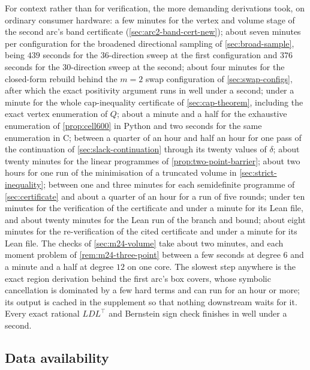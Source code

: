 \documentclass[11pt,reqno]{amsart}
\renewcommand{\_}{\origunderscore\allowbreak}
\numberwithin{equation}{section}
\theoremstyle{plain}
\theoremstyle{definition}
\theoremstyle{remark}
\begin{document}
For context rather than for verification, the more demanding derivations
took, on ordinary consumer hardware: a few minutes for the vertex and
volume stage of the second arc's band certificate
(\cref{sec:arc2-band-cert-new}); about seven minutes per configuration
for the broadened directional sampling of \cref{sec:broad-sample},
being $439$ seconds for the $36$-direction sweep at the first
configuration and $376$ seconds for the $30$-direction sweep at the
second; about four minutes for the closed-form rebuild behind the $m=2$
swap configuration of \cref{sec:swap-configs}, after which the exact
positivity argument runs in well under a second; under a minute for
the whole cap-inequality certificate of \cref{sec:cap-theorem},
including the exact vertex enumeration of $Q$; about a minute and a half
for the exhaustive enumeration of \cref{prop:cell600} in Python and two
seconds for the same enumeration in C; between a quarter of an hour
and half an hour for one pass of the continuation of
\cref{sec:slack-continuation} through its twenty values of $\delta$;
about twenty minutes for the linear programmes of
\cref{prop:two-point-barrier}; about two hours for one run of the
minimisation of a truncated volume in \cref{sec:strict-inequality};
between one and three minutes for each semidefinite programme of
\cref{sec:certificate} and about a quarter of an hour for a run of
five rounds; under ten minutes for the verification of the certificate
and under a minute for its Lean file, and about twenty minutes for the
Lean run of the branch and bound; about eight minutes for the
re-verification of the cited certificate and under a minute for its
Lean file. The checks of \cref{sec:m24-volume} take about two minutes, and
each moment problem of \cref{rem:m24-three-point} between a few seconds
at degree $6$ and a minute and a half at degree $12$ on one core. The slowest step
anywhere is the exact region derivation behind the first arc's
box covers, whose symbolic cancellation is dominated by a few hard
terms and can run for an hour or more; its output is cached in the
supplement so that nothing downstream waits for it. Every exact rational
$LDL^\top$ and Bernstein sign check finishes in well under a second.

\subsection*{Data availability}
\end{document}
